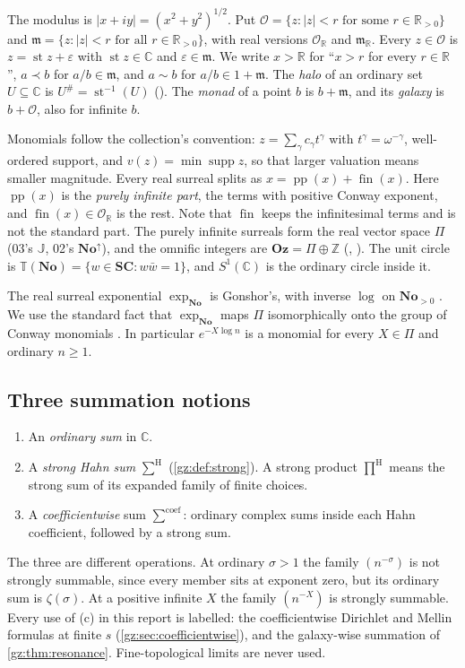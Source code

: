 \documentclass[11pt,a4paper]{article}
\numberwithin{equation}{section}
\theoremstyle{definition}
\theoremstyle{remark}
\newcommand{\No}{\mathbf{No}}
\newcommand{\SC}{\mathbf{SC}}
\newcommand{\Oz}{\mathbf{Oz}}
\newcommand{\R}{\mathbb R}
\newcommand{\C}{\mathbb C}
\newcommand{\Z}{\mathbb Z}
\newcommand{\OO}{\mathcal O}
\newcommand{\mm}{\mathfrak m}
\newcommand{\TT}{\mathbb T}
\newcommand{\eps}{\varepsilon}
\newcommand{\st}{\operatorname{st}}
\newcommand{\pp}{\operatorname{pp}}
\newcommand{\fin}{\operatorname{fin}}
\newcommand{\supp}{\operatorname{supp}}
\newcommand{\Sh}{\mathop{\textstyle\sum}\nolimits^{\mathrm H}}
\newcommand{\Ph}{\mathop{\textstyle\prod}\nolimits^{\mathrm H}}
\newcommand{\Scoef}{\mathop{\textstyle\sum}\nolimits^{\mathrm{coef}}}
\begin{document}
The modulus is $|x+iy|=(x^2+y^2)^{1/2}$. Put
$\OO=\{z:|z|<r\text{ for some }r\in\R_{>0}\}$ and
$\mm=\{z:|z|<r\text{ for all }r\in\R_{>0}\}$, with real versions $\OO_\R$
and $\mm_\R$. Every $z\in\OO$ is $z=\st z+\eps$ with $\st z\in\C$ and
$\eps\in\mm$. We write $x>\R$ for ``$x>r$ for every $r\in\R$'',
$a\prec b$ for $a/b\in\mm$, and $a\sim b$ for $a/b\in1+\mm$. The
\emph{halo} of an ordinary set $U\subseteq\C$ is $U^\#=\st^{-1}(U)$
(). The \emph{monad} of a point $b$ is $b+\mm$, and its
\emph{galaxy} is $b+\OO$, also for infinite $b$.

Monomials follow the collection's convention: $z=\sum_\gamma c_\gamma t^\gamma$
with $t^\gamma=\omega^{-\gamma}$, well-ordered support, and
$v(z)=\min\supp z$, so that larger valuation means smaller magnitude.
Every real surreal splits as $x=\pp(x)+\fin(x)$. Here $\pp(x)$ is the
\emph{purely infinite part}, the terms with positive Conway exponent, and
$\fin(x)\in\OO_\R$ is the rest. Note that $\fin$ keeps the infinitesimal
terms and is not the standard part. The purely infinite surreals form the
real vector space $\Pi$ (03's $\mathbb J$, 02's $\No^\uparrow$), and the
omnific integers are $\Oz=\Pi\oplus\Z$ (\cite{RFound}, ).
The unit circle is $\TT(\No)=\{w\in\SC:w\bar w=1\}$, and $S^1(\C)$ is
the ordinary circle inside it.

The real surreal exponential $\exp_{\No}$ is Gonshor's, with inverse
$\log$ on $\No_{>0}$ \cite{Gonshor,vdDE}. We use the standard fact that
$\exp_{\No}$ maps $\Pi$ isomorphically onto the group of Conway monomials
\cite[Proposition 3.2]{EK}. In particular $e^{-X\log n}$ is a monomial for
every $X\in\Pi$ and ordinary $n\ge1$.

\subsection{Three summation notions}\label{gz:sec:sumnotions}
\begin{enumerate}[label=(\alph*)]
\item An \emph{ordinary sum} in $\C$.
\item A \emph{strong Hahn sum} $\Sh$ (\cref{gz:def:strong}). A strong
 product $\Ph$ means the strong sum of its expanded family of finite choices.
\item A \emph{coefficientwise} sum $\Scoef$: ordinary complex sums inside
 each Hahn coefficient, followed by a strong sum.
\end{enumerate}
The three are different operations. At ordinary $\sigma>1$ the family
$(n^{-\sigma})$ is not strongly summable, since every member sits at
exponent zero, but its ordinary sum is $\zeta(\sigma)$. At a positive
infinite $X$ the family $(n^{-X})$ is strongly summable. Every use of (c)
in this report is labelled: the coefficientwise Dirichlet and Mellin
formulas at finite $s$ (\cref{gz:sec:coefficientwise}), and the
galaxy-wise summation of \cref{gz:thm:resonance}. Fine-topological limits
are never used.
\end{document}
